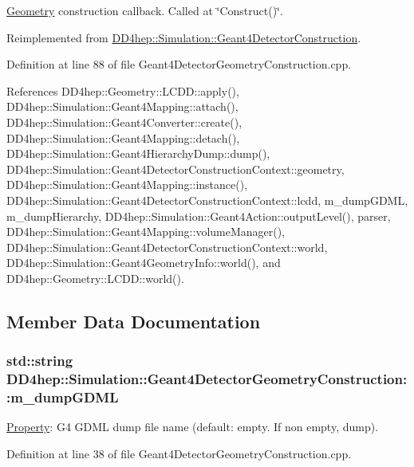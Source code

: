 \hyperlink{namespace_d_d4hep_1_1_geometry}{Geometry} construction callback. Called at \char`\"{}Construct()\char`\"{}. 

Reimplemented from \hyperlink{class_d_d4hep_1_1_simulation_1_1_geant4_detector_construction_a91ab552e6ee76df9e0ebff3351863ebd}{DD4hep::Simulation::Geant4DetectorConstruction}.

Definition at line 88 of file Geant4DetectorGeometryConstruction.cpp.

References DD4hep::Geometry::LCDD::apply(), DD4hep::Simulation::Geant4Mapping::attach(), DD4hep::Simulation::Geant4Converter::create(), DD4hep::Simulation::Geant4Mapping::detach(), DD4hep::Simulation::Geant4HierarchyDump::dump(), DD4hep::Simulation::Geant4DetectorConstructionContext::geometry, DD4hep::Simulation::Geant4Mapping::instance(), DD4hep::Simulation::Geant4DetectorConstructionContext::lcdd, m\_\-dumpGDML, m\_\-dumpHierarchy, DD4hep::Simulation::Geant4Action::outputLevel(), parser, DD4hep::Simulation::Geant4Mapping::volumeManager(), DD4hep::Simulation::Geant4DetectorConstructionContext::world, DD4hep::Simulation::Geant4GeometryInfo::world(), and DD4hep::Geometry::LCDD::world().

\subsection{Member Data Documentation}
\hypertarget{class_d_d4hep_1_1_simulation_1_1_geant4_detector_geometry_construction_abb2b35066d2a33cd98aaf1d960ce60cc}{
\subsubsection[{m\_\-dumpGDML}]{\setlength{\rightskip}{0pt plus 5cm}std::string {\bf DD4hep::Simulation::Geant4DetectorGeometryConstruction::m\_\-dumpGDML}}}
\label{class_d_d4hep_1_1_simulation_1_1_geant4_detector_geometry_construction_abb2b35066d2a33cd98aaf1d960ce60cc}


\hyperlink{class_d_d4hep_1_1_property}{Property}: G4 GDML dump file name (default: empty. If non empty, dump). 

Definition at line 38 of file Geant4DetectorGeometryConstruction.cpp.

